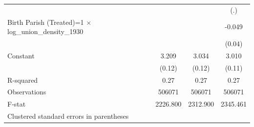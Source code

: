 {\begin{tabular}{l*{3}{c}}
                    &                     &                     &         (.)         \\
Birth Parish (Treated)=1 $\times$ log\_union\_density\_1930&                     &                     &      -0.049         \\
                    &                     &                     &      (0.04)         \\
Constant            &       3.209\sym{***}&       3.034\sym{***}&       3.010\sym{***}\\
                    &      (0.12)         &      (0.12)         &      (0.11)         \\
\hline
R-squared           &        0.27         &        0.27         &        0.27         \\
Observations        &      506071         &      506071         &      506071         \\
F-stat              &    2226.800         &    2312.900         &    2345.461         \\
\hline\hline
\multicolumn{4}{l}{\footnotesize Clustered standard errors in parentheses}\\
\end{tabular}
}
